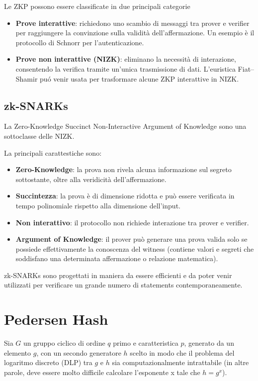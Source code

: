 Le ZKP possono essere classificate in due principali categorie
\begin{itemize}
    \item \textbf{Prove interattive}: richiedono uno scambio di messaggi tra prover e verifier per raggiungere la convinzione sulla validità dell’affermazione. Un esempio è il protocollo di Schnorr per l’autenticazione.
    \item \textbf{Prove non interattive (NIZK)}: eliminano la necessità di interazione, consentendo la verifica tramite un'unica trasmissione di dati. L'euristica Fiat–Shamir puó venir usata per trasformare alcune ZKP interattive in NIZK.
\end{itemize}

\subsection{zk-SNARKs}

La Zero-Knowledge Succinct Non-Interactive Argument of Knowledge sono una sottoclasse delle NIZK.

La principali carattestiche sono:

\begin{itemize}
    \item \textbf{Zero-Knowledge}: la prova non rivela alcuna informazione sul segreto sottostante, oltre alla veridicità dell'affermazione.
    \item \textbf{Succintezza}: la prova è di dimensione ridotta e può essere verificata in tempo polinomiale rispetto alla dimensione dell'input.
    \item \textbf{Non interattivo}: il protocollo non richiede interazione tra prover e verifier.
    \item \textbf{Argument of Knowledge}: il prover può generare una prova valida solo se possiede effettivamente la conoscenza del witness (contiene valori e segreti che soddisfano una determinata affermazione o relazione matematica).
\end{itemize}

zk-SNARKs sono progettati in maniera da essere efficienti e da poter venir utilizzati per verificare un grande numero di statements contemporaneamente.

\section{Pedersen Hash}

\cite{pedersen1991non}
Sia $G$ un gruppo ciclico di ordine $q$ primo e caratteristica $p$, generato da un elemento $g$, con un secondo generatore $h$ scelto in modo che il problema del logaritmo discreto (DLP) tra $g$ e $h$ sia computazionalmente intrattabile (in altre parole, deve essere molto difficile calcolare l'esponente x tale che $h = g^x$).

